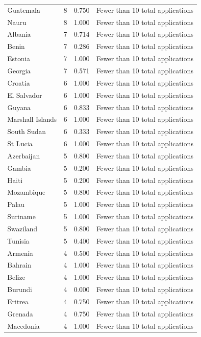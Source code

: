 \documentclass[runningheads]{llncs}
\begin{document}
{\begin{longtable}{p{}rrp{}}
Guatemala & 8 & 0.750 & Fewer than 10 total applications \\
Nauru & 8 & 1.000 & Fewer than 10 total applications \\
Albania & 7 & 0.714 & Fewer than 10 total applications \\
Benin & 7 & 0.286 & Fewer than 10 total applications \\
Estonia & 7 & 1.000 & Fewer than 10 total applications \\
Georgia & 7 & 0.571 & Fewer than 10 total applications \\
Croatia & 6 & 1.000 & Fewer than 10 total applications \\
El Salvador & 6 & 1.000 & Fewer than 10 total applications \\
Guyana & 6 & 0.833 & Fewer than 10 total applications \\
Marshall Islands & 6 & 1.000 & Fewer than 10 total applications \\
South Sudan & 6 & 0.333 & Fewer than 10 total applications \\
St Lucia & 6 & 1.000 & Fewer than 10 total applications \\
Azerbaijan & 5 & 0.800 & Fewer than 10 total applications \\
Gambia & 5 & 0.200 & Fewer than 10 total applications \\
Haiti & 5 & 0.200 & Fewer than 10 total applications \\
Mozambique & 5 & 0.800 & Fewer than 10 total applications \\
Palau & 5 & 1.000 & Fewer than 10 total applications \\
Suriname & 5 & 1.000 & Fewer than 10 total applications \\
Swaziland & 5 & 0.800 & Fewer than 10 total applications \\
Tunisia & 5 & 0.400 & Fewer than 10 total applications \\
Armenia & 4 & 0.500 & Fewer than 10 total applications \\
Bahrain & 4 & 1.000 & Fewer than 10 total applications \\
Belize & 4 & 1.000 & Fewer than 10 total applications \\
Burundi & 4 & 0.000 & Fewer than 10 total applications \\
Eritrea & 4 & 0.750 & Fewer than 10 total applications \\
Grenada & 4 & 0.750 & Fewer than 10 total applications \\
Macedonia & 4 & 1.000 & Fewer than 10 total applications \\

\end{longtable}}
\end{document}

